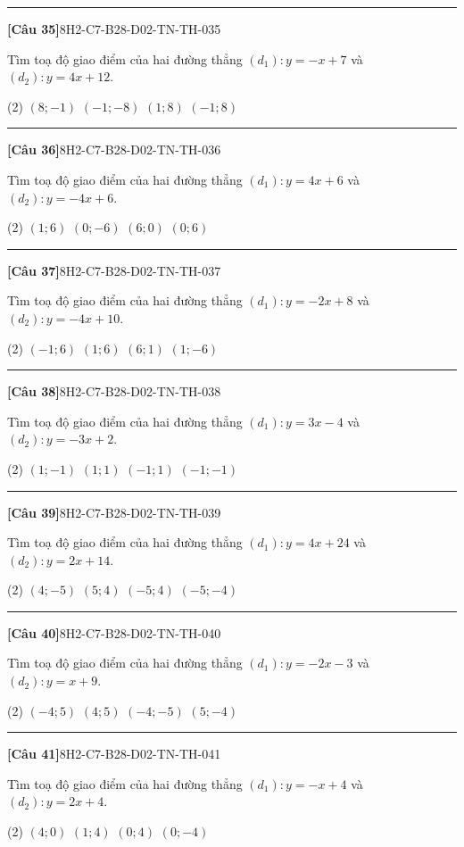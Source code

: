 \documentclass[12pt,a4paper]{article}
\newif\ifloigiai
\newenvironment{cauhoi}[2]{%
  \par\medskip\noindent\rule{\textwidth}{0.4pt}\par\nopagebreak
  \noindent\textbf{[#1]}\hfill{\scriptsize\ttfamily #2}\par\nopagebreak\smallskip}{\par}
\newcommand{\dapan}[1]{\ifloigiai\par\smallskip\noindent\textit{Đáp án:} \textbf{#1}\par\fi}
\begin{document}
\begin{cauhoi}{Câu 35}{8H2-C7-B28-D02-TN-TH-035}
Tìm toạ độ giao điểm của hai đường thẳng $(d_1): y=-x+7$ và $(d_2): y=4x+12$.
\begin{tasks}(2)
\task $(8;-1)$
\task $(-1;-8)$
\task $(1;8)$
\task $(-1;8)$
\end{tasks}
\dapan{D}
\end{cauhoi}
\begin{cauhoi}{Câu 36}{8H2-C7-B28-D02-TN-TH-036}
Tìm toạ độ giao điểm của hai đường thẳng $(d_1): y=4x+6$ và $(d_2): y=-4x+6$.
\begin{tasks}(2)
\task $(1;6)$
\task $(0;-6)$
\task $(6;0)$
\task $(0;6)$
\end{tasks}
\dapan{D}
\end{cauhoi}
\begin{cauhoi}{Câu 37}{8H2-C7-B28-D02-TN-TH-037}
Tìm toạ độ giao điểm của hai đường thẳng $(d_1): y=-2x+8$ và $(d_2): y=-4x+10$.
\begin{tasks}(2)
\task $(-1;6)$
\task $(1;6)$
\task $(6;1)$
\task $(1;-6)$
\end{tasks}
\dapan{B}
\end{cauhoi}
\begin{cauhoi}{Câu 38}{8H2-C7-B28-D02-TN-TH-038}
Tìm toạ độ giao điểm của hai đường thẳng $(d_1): y=3x-4$ và $(d_2): y=-3x+2$.
\begin{tasks}(2)
\task $(1;-1)$
\task $(1;1)$
\task $(-1;1)$
\task $(-1;-1)$
\end{tasks}
\dapan{A}
\end{cauhoi}
\begin{cauhoi}{Câu 39}{8H2-C7-B28-D02-TN-TH-039}
Tìm toạ độ giao điểm của hai đường thẳng $(d_1): y=4x+24$ và $(d_2): y=2x+14$.
\begin{tasks}(2)
\task $(4;-5)$
\task $(5;4)$
\task $(-5;4)$
\task $(-5;-4)$
\end{tasks}
\dapan{C}
\end{cauhoi}
\begin{cauhoi}{Câu 40}{8H2-C7-B28-D02-TN-TH-040}
Tìm toạ độ giao điểm của hai đường thẳng $(d_1): y=-2x-3$ và $(d_2): y=x+9$.
\begin{tasks}(2)
\task $(-4;5)$
\task $(4;5)$
\task $(-4;-5)$
\task $(5;-4)$
\end{tasks}
\dapan{A}
\end{cauhoi}
\begin{cauhoi}{Câu 41}{8H2-C7-B28-D02-TN-TH-041}
Tìm toạ độ giao điểm của hai đường thẳng $(d_1): y=-x+4$ và $(d_2): y=2x+4$.
\begin{tasks}(2)
\task $(4;0)$
\task $(1;4)$
\task $(0;4)$
\task $(0;-4)$
\end{tasks}
\dapan{C}
\end{cauhoi}
\end{document}

